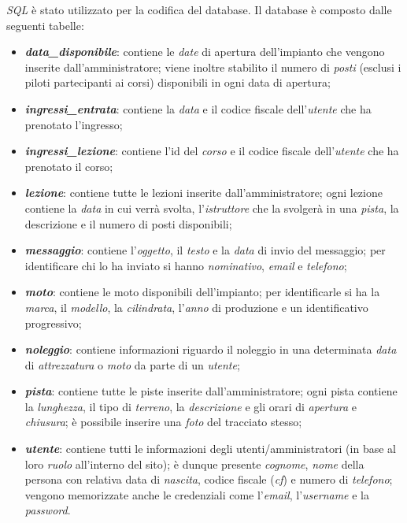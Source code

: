 \textit{SQL} è stato utilizzato per la codifica del database. Il database è composto dalle seguenti tabelle:
\begin{itemize}
    \item \textbf{\textit{data\_disponibile}}: contiene le \textit{date} di apertura dell'impianto che vengono
    inserite dall'amministratore; viene inoltre stabilito il numero di \textit{posti} (esclusi i piloti
    partecipanti ai corsi) disponibili in ogni data di apertura;
    
    \item \textbf{\textit{ingressi\_entrata}}: contiene la \textit{data} e il codice fiscale dell'\textit{utente} che ha prenotato l'ingresso;
    
    \item \textbf{\textit{ingressi\_lezione}}: contiene l'id del \textit{corso} e il codice fiscale dell'\textit{utente} che ha prenotato il corso;
    
    \item \textbf{\textit{lezione}}: contiene tutte le lezioni inserite dall'amministratore; ogni lezione contiene la \textit{data}
    in cui verrà svolta, l'\textit{istruttore} che la svolgerà in una \textit{pista}, la descrizione e il numero di posti disponibili;
    
    \item \textbf{\textit{messaggio}}: contiene l'\textit{oggetto}, il \textit{testo} e la \textit{data} di invio del messaggio; per identificare
    chi lo ha inviato si hanno \textit{nominativo}, \textit{email} e \textit{telefono};
    
    \item \textbf{\textit{moto}}: contiene le moto disponibili dell'impianto; per identificarle si ha la \textit{marca}, il \textit{modello},
    la \textit{cilindrata}, l'\textit{anno} di produzione e un identificativo progressivo;
    
    \item \textbf{\textit{noleggio}}: contiene informazioni riguardo il noleggio in una determinata \textit{data} di \textit{attrezzatura} o
    \textit{moto} da parte di un \textit{utente};
    
    \item \textbf{\textit{pista}}: contiene tutte le piste inserite dall'amministratore; ogni pista contiene la \textit{lunghezza}, il tipo di \textit{terreno}, la \textit{descrizione} e gli orari di \textit{apertura} e \textit{chiusura}; è possibile inserire una \textit{foto} del tracciato stesso;
    
    \item \textbf{\textit{utente}}: contiene tutti le informazioni degli utenti/amministratori (in base al loro \textit{ruolo} all'interno del sito);
    è dunque presente \textit{cognome}, \textit{nome} della persona con relativa data di \textit{nascita}, codice fiscale (\textit{cf}) e
    numero di \textit{telefono}; vengono memorizzate anche le credenziali come l'\textit{email}, l'\textit{username} e la \textit{password}.
\end{itemize}
